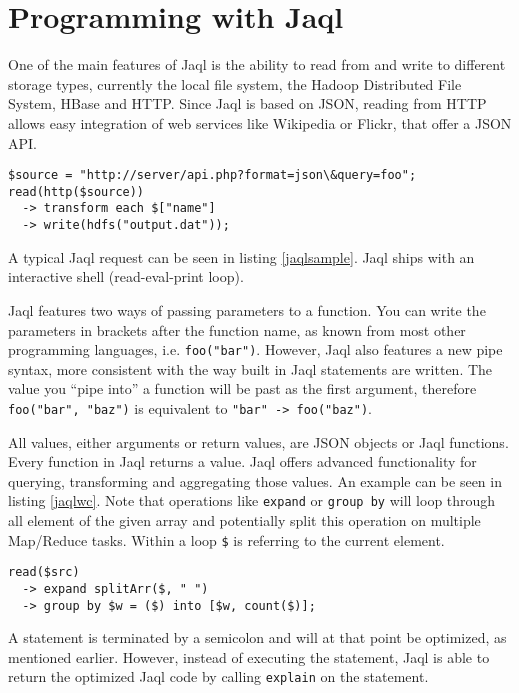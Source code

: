 \section{Programming with Jaql}

One of the main features of Jaql is the ability to read from and write to different
storage types, currently the local file system, the Hadoop Distributed File System,
HBase and HTTP. Since Jaql is based on JSON, reading
from HTTP allows easy integration of web services like Wikipedia or Flickr, that offer
a JSON API.

\begin{lstlisting}[language=jaql,caption=A sample Jaql query,float,label=jaqlsample]
$source = "http://server/api.php?format=json\&query=foo";
read(http($source)) 
  -> transform each $["name"]
  -> write(hdfs("output.dat"));
\end{lstlisting}

A typical Jaql request can be seen in listing \ref{jaqlsample}. Jaql ships with an
interactive shell (read-eval-print loop). 

Jaql features two ways of passing parameters to a function. You can write the parameters
in brackets after the function name, as known from most other programming languages, i.e.
\lstinline[language=jaql]!foo("bar")!. However, Jaql also features a new pipe syntax, more
consistent with the way built in Jaql statements are written. The value you ``pipe into''
a function will be past as the first argument, therefore \lstinline[language=jaql]!foo("bar", "baz")!
is equivalent to \lstinline[language=jaql]!"bar" -> foo("baz")!.

All values, either arguments or return values, are JSON objects or Jaql functions.
Every function in Jaql returns a value. Jaql offers advanced functionality for querying, transforming
and aggregating those values. An example can be seen in listing \ref{jaqlwc}. Note that
operations like {\tt expand} or {\tt group by} will loop through all element of the given array
and potentially split this operation on multiple Map/Reduce tasks. Within a loop {\tt\$} is referring
to the current element.

\begin{lstlisting}[language=jaql,caption=Wordcount in Jaql,label=jaqlwc]
read($src)
  -> expand splitArr($, " ")
  -> group by $w = ($) into [$w, count($)];
\end{lstlisting}

A statement is terminated by a semicolon and will at that point be optimized, as mentioned earlier.
However, instead of executing the statement, Jaql is able to return the optimized Jaql code by calling
{\tt explain} on the statement.